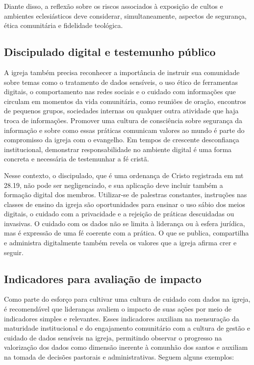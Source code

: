 Diante disso, a reflexão sobre os riscos associados à exposição de cultos e ambientes eclesiásticos deve considerar, simultaneamente, aspectos de segurança, ética comunitária e fidelidade teológica.

\subsection{Discipulado digital e testemunho público}

A igreja também precisa reconhecer a importância de instruir sua comunidade sobre temas como o tratamento de dados sensíveis, o uso ético de ferramentas digitais, o comportamento nas redes sociais e o cuidado com informações que circulam em momentos da vida comunitária, como reuniões de oração, encontros de pequenos grupos, sociedades internas ou qualquer outra atividade que haja troca de informações. Promover uma cultura de consciência sobre segurança da informação e sobre como essas práticas comunicam valores ao mundo é parte do compromisso da igreja com o evangelho. Em tempos de crescente desconfiança institucional, demonstrar responsabilidade no ambiente digital é uma forma concreta e necessária de testemunhar a fé cristã.

Nesse contexto, o discipulado, que é uma ordenança de Cristo registrada em \gls{mt} 28.19, não pode ser negligenciado, e sua aplicação deve incluir também a formação digital dos membros. Utilizar-se de palestras constantes, instruções nas classes de ensino da igreja são oportunidades para ensinar o uso sábio dos meios digitais, o cuidado com a privacidade e a rejeição de práticas descuidadas ou invasivas. O cuidado com os dados não se limita à liderança ou à esfera jurídica, mas é expressão de uma fé coerente com a prática. O que se publica, compartilha e administra digitalmente também revela os valores que a igreja afirma crer e seguir.

\subsection{Indicadores para avaliação de impacto}

Como parte do esforço para cultivar uma cultura de cuidado com dados na igreja, é recomendável que lideranças avaliem o impacto de suas ações por meio de indicadores simples e relevantes. Esses indicadores auxiliam na mensuração da maturidade institucional e do engajamento comunitário com a cultura de gestão e cuidado de dados sensíveis na igreja, permitindo observar o progresso na valorização dos dados como dimensão inerente à comunhão dos santos e auxiliam na tomada de decisões pastorais e administrativas. Seguem alguns exemplos:

